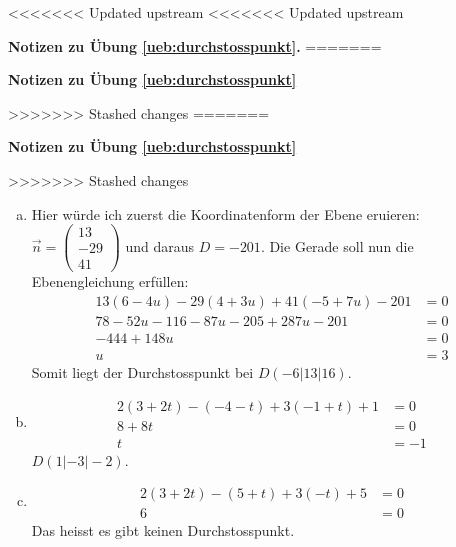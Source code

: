 \documentclass[%
11pt,%
twoside,%
titlepage,%
<<<<<<< Updated upstream
<<<<<<< Updated upstream
german,%
=======
swissgerman,%
>>>>>>> Stashed changes
=======
swissgerman,%
>>>>>>> Stashed changes
headsepline%
]{scrartcl}
\newcommand{\faReturnGray}{\textcolor{gray}{\faMailReply}} %
\newcommand{\faReturnGray}{\textcolor{gray}{\faMailReply}} %
\theoremstyle{definition}
\theoremstyle{plain}
\newcommand{\concatueb}[1]{ueb:#1}%
\newcommand{\concatlsg}[1]{lsg:#1}%
\newenvironment{lsg}[1]{%
<<<<<<< Updated upstream
<<<<<<< Updated upstream
    \par\noindent\textbf{Notizen zu Übung \ref{\concatueb{#1}}.}%
    \label{\concatlsg{#1}}
=======
    \par\noindent\textbf{Notizen zu Übung \ref{\concatueb{#1}}}\label{\concatlsg{#1}}
    \hfill\hyperref[\concatueb{#1}]{\faReturnGray}\par %
>>>>>>> Stashed changes
=======
    \par\noindent\textbf{Notizen zu Übung \ref{\concatueb{#1}}}\label{\concatlsg{#1}}
    \hfill\hyperref[\concatueb{#1}]{\faReturnGray}\par %
>>>>>>> Stashed changes
}{%
    \par%
}
\begin{document}
\begin{lsg}{durchstosspunkt}
\begin{enumerate}[a)]
    \item Hier würde ich zuerst die Koordinatenform der Ebene eruieren: $\vec{n}=\begin{pmatrix}
        13\\-29\\41
    \end{pmatrix}$ und daraus $D=-201$. Die Gerade soll nun die Ebenengleichung erfüllen:
    \begin{align*}
        13(6-4u)-29(4+3u)+41(-5+7u)-201 &= 0\\
        78-52u-116-87u-205+287u-201 &= 0\\
        -444+148u &= 0\\
        u &= 3
    \end{align*}
    Somit liegt der Durchstosspunkt bei $D(-6|13|16)$.

    \item \begin{align*}
        2(3+2t)-(-4-t)+3(-1+t)+1 &= 0\\
        8+8t &= 0\\
        t &= -1
    \end{align*}
    $D(1|-3|-2)$.

    \item \begin{align*}
        2(3+2t)-(5+t)+3(-t)+5 &= 0\\
        6 &= 0
    \end{align*}
    Das heisst es gibt keinen Durchstosspunkt.
\end{enumerate}
\end{lsg}
\end{document}
